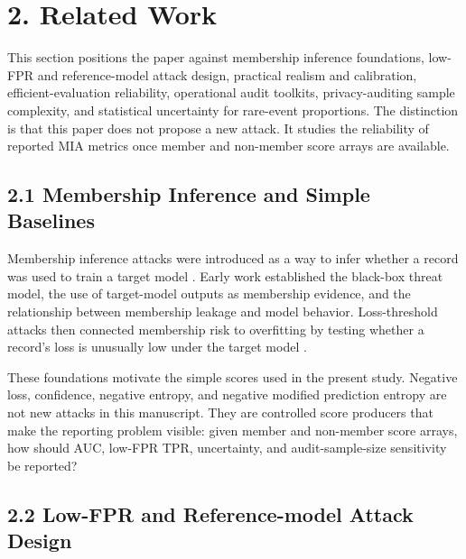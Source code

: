 \documentclass[
  10pt,
  twocolumn]{article}
\begin{document}
\hypertarget{related-work}{%
\section{2. Related Work}\label{related-work}}

This section positions the paper against membership inference foundations, low-FPR and reference-model attack design, practical realism and calibration, efficient-evaluation reliability, operational audit toolkits, privacy-auditing sample complexity, and statistical uncertainty for rare-event proportions. The distinction is that this paper does not propose a new attack. It studies the reliability of reported MIA metrics once member and non-member score arrays are available.

\hypertarget{membership-inference-and-simple-baselines}{%
\subsection{2.1 Membership Inference and Simple Baselines}\label{membership-inference-and-simple-baselines}}

Membership inference attacks were introduced as a way to infer whether a record was used to train a target model \cite{ref-1}. Early work established the black-box threat model, the use of target-model outputs as membership evidence, and the relationship between membership leakage and model behavior. Loss-threshold attacks then connected membership risk to overfitting by testing whether a record's loss is unusually low under the target model \cite{ref-2}.

These foundations motivate the simple scores used in the present study. Negative loss, confidence, negative entropy, and negative modified prediction entropy are not new attacks in this manuscript. They are controlled score producers that make the reporting problem visible: given member and non-member score arrays, how should AUC, low-FPR TPR, uncertainty, and audit-sample-size sensitivity be reported?

\hypertarget{low-fpr-and-reference-model-attack-design}{%
\subsection{2.2 Low-FPR and Reference-model Attack Design}\label{low-fpr-and-reference-model-attack-design}}
\end{document}
